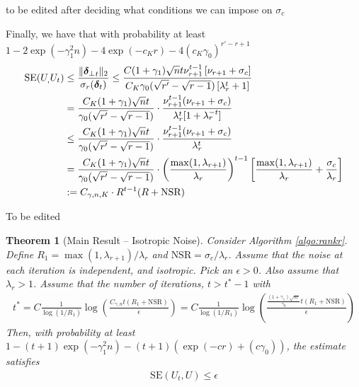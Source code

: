\documentclass[10pt]{article}
\newtheorem{theorem}{Theorem}
\newcommand{\nsrmax}{\text{NSR}}
\newcommand{\SE}{\mathrm{SE}}
\begin{document}
{\color{blue} to be edited after deciding what conditions we can impose on $\sigma_c$

Finally, we have that with probability at least $1 - 2 \exp(- \gamma_1^2 n) - 4 \exp(-c_Kr) - 4 (c_K \gamma_0)^{r'-r+1}$  
\begin{align*}
\SE(U_,U_t) &\leq \frac{\|\utsin_t\|_2}{\sigma_r(\utcos_t)} \leq \frac{C (1+ \gamma_1) \sqrt{n} t \nu_{r+1}^{t-1} \left[\nu_{r+1} +  \sigma_c\right]}{C_K \gamma_0(\sqrt{r'} - \sqrt{r-1}) \left[ \lambda_r^t + 1 \right]} \\
&= \frac{C_K (1+ \gamma_1) \sqrt{n} t}{\gamma_0 (\sqrt{r'} - \sqrt{r-1})} \cdot \frac{ \nu_{r+1}^{t-1} (\nu_{r+1} +  \sigma_c )}{\lambda_r^t[ 1 + \lambda_r^{-t}]} \\
&\leq \frac{C_K (1+ \gamma_1) \sqrt{n} t}{\gamma_0 (\sqrt{r'} - \sqrt{r-1})} \cdot \frac{ \nu_{r+1}^{t-1} (\nu_{r+1} +  \sigma_c )}{\lambda_r^t} \\
& = \frac{C_K (1+ \gamma_1) \sqrt{n} t}{\gamma_0 (\sqrt{r'} - \sqrt{r-1})} \cdot \left(\frac{\max(1, \lambda_{r+1})}{\lambda_r}\right)^{t-1} \left[ \frac{\max(1, \lambda_{r+1})}{\lambda_r} + \frac{\sigma_c}{\lambda_r}   \right]  \\
&:= C_{\gamma, n, K} \cdot R^{t-1} (R + \nsrmax)  
\end{align*}

}

{\color{blue} To be edited
\begin{theorem}[Main Result -- Isotropic Noise]
Consider Algorithm \ref{algo:rankr}.
Define $R_1 = \max(1, \lambda_{r+1})/\lambda_r$ and $\nsrmax = \sigma_c/\lambda_r$. 
Assume that the noise at each iteration is independent, and isotropic. Pick an $\epsilon > 0$. Also assume that $\lambda_r > 1$.  Assume that the number of iterations, $t > t^* - 1$ with
\begin{align*}
t^* = C \frac{1}{\log(1/R_1)} \log   \left( \frac{C_{\gamma,n} t (R_1 + \nsrmax)}{\epsilon}\right) = C \frac{1}{\log(1/R_1)} \log   \left( \frac{\frac{(1+ \gamma_1)\sqrt{nr}}{\gamma_0} t (R_1 + \nsrmax)}{\epsilon}\right)
\end{align*}
 Then, with probability at least $1 - (t + 1) \exp(- \gamma_1^2 n) - (t+1) (\exp(-cr) + (c\gamma_0))$, the estimate satisfies
 \begin{align*}
 \SE(U_t, U) \leq \epsilon
 \end{align*}
\end{theorem}
}
\end{document}
